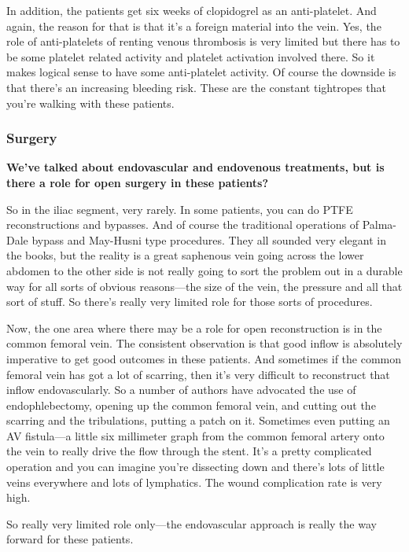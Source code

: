 \documentclass[
]{book}
\begin{document}
In addition, the patients get six weeks of clopidogrel as an
anti-platelet. And again, the reason for that is that it's a foreign
material into the vein. Yes, the role of anti-platelets of renting
venous thrombosis is very limited but there has to be some platelet
related activity and platelet activation involved there. So it makes
logical sense to have some anti-platelet activity. Of course the
downside is that there's an increasing bleeding risk. These are the
constant tightropes that you're walking with these patients.

\hypertarget{surgery-2}{%
\subsubsection{Surgery}\label{surgery-2}}

\textbf{We've talked about endovascular and endovenous treatments, but is
there a role for open surgery in these patients?}

So in the iliac segment, very rarely. In some patients, you can do PTFE
reconstructions and bypasses. And of course the traditional operations
of Palma-Dale\citep{palma1960} bypass and May-Husni\citep{shaydakov2015} type
procedures. They all sounded very elegant in the books, but the reality
is a great saphenous vein going across the lower abdomen to the other
side is not really going to sort the problem out in a durable way for
all sorts of obvious reasons---the size of the vein, the pressure and
all that sort of stuff. So there's really very limited role for those
sorts of procedures.

Now, the one area where there may be a role for open reconstruction is
in the common femoral vein. The consistent observation is that good
inflow is absolutely imperative to get good outcomes in these patients.
And sometimes if the common femoral vein has got a lot of scarring, then
it's very difficult to reconstruct that inflow endovascularly. So a
number of authors have advocated the use of endophlebectomy, opening up
the common femoral vein, and cutting out the scarring and the
tribulations, putting a patch on it. Sometimes even putting an AV
fistula---a little six millimeter graph from the common femoral artery
onto the vein to really drive the flow through the stent. It's a pretty
complicated operation and you can imagine you're dissecting down and
there's lots of little veins everywhere and lots of lymphatics. The
wound complication rate is very high.

So really very limited role only---the endovascular approach is really
the way forward for these patients.
\end{document}
